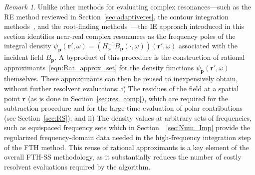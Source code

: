 \documentclass[11pt]{article}
\theoremstyle{plain}
\theoremstyle{remark}
\newtheorem{remark}{Remark}
\def \br{\mathbf{r}}
\def \bp{\mathbf{p}}
\begin{document}
\begin{remark}\label{rmk:IEmethod}
  Unlike other methods for evaluating complex resonances—such as the
  RE method reviewed in Section~\ref{sec:adaptiveres}, the contour
  integration
  methods~\cite{Beyn2012eigen,misawa2017boundary,asakura2009numerical},
  and the root-finding methods~\cite{guttel2017nonlinear}---the IE
  approach introduced in this section identifies near-real complex
  resonances as the frequency poles of the integral density
  $\psi_\bp(\br',\omega) = \left(H_\omega^{-1}B_\bp(\cdot,\omega)\right)(\br',\omega)$ associated with the incident field
  $B_\bp$. A byproduct of this procedure is the construction of
  rational approximants~\eqref{eqn:Rat_approx_set} for the density
  functions $\psi_\bp(\br',\omega)$ themselves. These approximants can
  then be reused to inexpensively obtain, without further resolvent
  evaluations: i) The residues of the field at a spatial point $\br$
  (as is done in Section~\ref{sec:res_comp}), which are required for
  the subtraction procedure and for the large-time evaluation of polar
  contributions (see Section~\ref{sec:RS}); and ii) The density values
  at arbitrary sets of frequencies, such as equispaced frequency sets
  which in Section~~\ref{sec:Num_Imp} provide the regularized
  frequency-domain data needed in the high-frequency integration step
  of the FTH method. This reuse of rational approximants is a key
  element of the overall FTH-SS methodology, as it substantially
  reduces the number of costly resolvent evaluations required by the
  algorithm.
\end{remark} 
\end{document}
